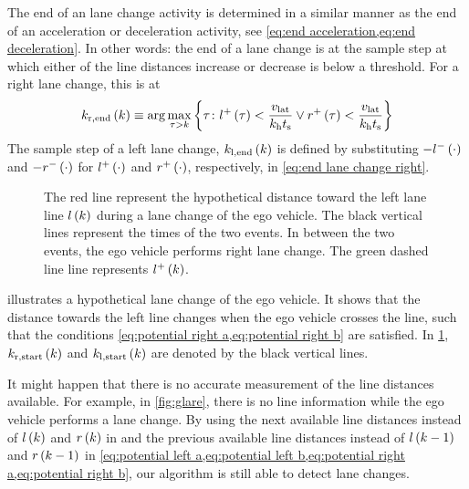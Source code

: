 The end of an lane change activity is determined in a similar manner as the end of an acceleration or deceleration activity, see \cref{eq:end acceleration,eq:end deceleration}.
In other words: the end of a lane change is at the sample step at which either of the line distances increase or decrease is below a threshold. For a right lane change, this is at
\begin{equation}
	\label{eq:end lane change right}
	k_\mathrm{r,end}\left(k\right) \equiv \arg \max_{\tau > k} \left\{ \tau\colon l^{+}\left(\tau\right)<\frac{v_{\mathrm{lat}}}{k_{\mathrm{h}}t_\mathrm{s}} \lor r^{+}\left(\tau\right)<\frac{v_{\mathrm{lat}}}{k_{\mathrm{h}}t_\mathrm{s}} \right\}
\end{equation}
The sample step of a left lane change, $k_\mathrm{l,end}\left(k\right)$ is defined by substituting $-l^{-}\left(\cdot\right)$ and $-r^{-}\left(\cdot\right)$ for $l^{+}\left(\cdot\right)$ and $r^{+}\left(\cdot\right)$, respectively, in \cref{eq:end lane change right}.
\cenda

\setlength{\figurewidth}{\linewidth}
\setlength{\figureheight}{0.6\linewidth}
\begin{figure}
	\centering
	
	\caption{\cstarta The red line represent the hypothetical distance toward the left lane line $l\left(k\right)$ during a lane change of the ego vehicle. The black vertical lines represent the times of the two events. In between the two events, the ego vehicle performs right lane change. The green dashed line line represents $l^{+}\left(k\right)$.\cenda}
	\label{fig:ego lane change}
\end{figure}

\cstarta
{} illustrates a hypothetical lane change of the ego vehicle. It shows that the distance towards the left line changes when the ego vehicle crosses the line, such that the conditions \cref{eq:potential right a,eq:potential right b} are satisfied. In \cref{fig:ego lane change}, $k_\mathrm{r,start}\left(k\right)$ and $k_\mathrm{l,start}\left(k\right)$ are denoted by the black vertical lines.

\begin{remark}
	It might happen that there is no accurate measurement of the line distances available. For example, in \cref{fig:glare}, there is no line information while the ego vehicle performs a lane change. By using the next available line distances instead of $l\left(k\right)$ and $r\left(k\right)$ in and the previous available line distances instead of $l\left(k-1\right)$ and $r\left(k-1\right)$ in \cref{eq:potential left a,eq:potential left b,eq:potential right a,eq:potential right b}, our algorithm is still able to detect lane changes.
\end{remark}
\cenda

